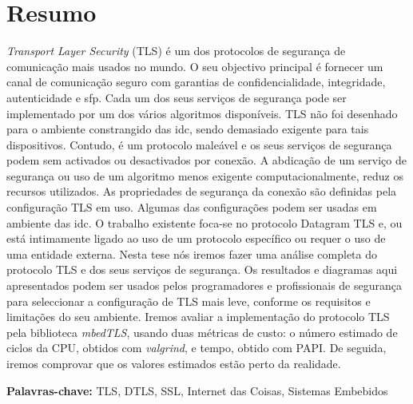 
\section*{Resumo}




\textit{Transport Layer Security} (TLS) é um dos protocolos de segurança de comunicação mais
usados no mundo. O seu objectivo principal é fornecer um canal de comunicação seguro
com garantias de confidencialidade, integridade, autenticidade e \gls{sfp}.
Cada um dos seus serviços de segurança pode ser implementado por um dos vários
algoritmos disponíveis. TLS não foi desenhado para o ambiente constrangido
das \gls{idc}, sendo demasiado exigente para tais dispositivos. Contudo, é um
protocolo maleável e os seus serviços de segurança podem sem activados ou
desactivados por conexão. A abdicação de um serviço de segurança ou uso de um
algoritmo menos exigente computacionalmente, reduz os recursos utilizados.
As propriedades de segurança da conexão são definidas pela configuração TLS
em uso. Algumas das configurações podem ser usadas em ambiente das \gls{idc}.
O trabalho existente foca-se no protocolo Datagram TLS e, ou está intimamente
ligado ao uso de um protocolo específico ou requer o uso de uma entidade
externa. Nesta tese nós iremos fazer uma análise completa do protocolo TLS e
dos seus serviços de segurança. Os resultados e diagramas aqui apresentados
podem ser usados pelos programadores e profissionais de segurança para seleccionar
a configuração de TLS mais leve, conforme os requisitos e limitações
do seu ambiente. Iremos avaliar a implementação do protocolo TLS pela
biblioteca \textit{mbedTLS}, usando duas métricas de custo: o número estimado
de ciclos da CPU, obtidos com \textit{valgrind}, e tempo, obtido com PAPI.
De seguida, iremos comprovar que os valores estimados estão perto da realidade.

\vfill

\textbf{\Large Palavras-chave:} TLS, DTLS, SSL, Internet das Coisas, Sistemas Embebidos

